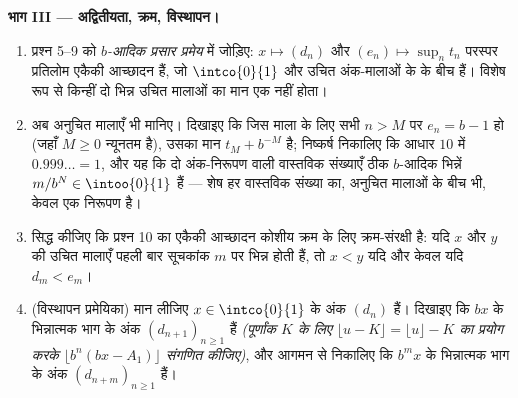 \begin{problem}
\medskip \noindent\textbf{भाग III --- अद्वितीयता, क्रम, विस्थापन।}
\begin{enumerate}[resume]
  \item प्रश्न 5--9 को \emph{$b$-आदिक प्रसार प्रमेय} में जोड़िए: 
  $x \mapsto (d_n)$ और $(e_n) \mapsto \sup_n t_n$ परस्पर प्रतिलोम एकैकी
  आच्छादन हैं, जो $\intco{0}{1}$ और उचित अंक-मालाओं के  के बीच हैं।
  विशेष रूप से किन्हीं दो भिन्न उचित मालाओं का मान एक नहीं होता।
  \item अब अनुचित मालाएँ भी मानिए। दिखाइए कि जिस माला के लिए सभी $n > M$ पर
  $e_n = b - 1$ हो (जहाँ $M \geq 0$ न्यूनतम है), उसका मान $t_M + b^{-M}$ है;
  निष्कर्ष निकालिए कि आधार $10$ में $0.999\dots = 1$, और यह कि दो अंक-निरूपण
  वाली वास्तविक संख्याएँ ठीक $b$-आदिक भिन्नें $m/b^N \in \intoo{0}{1}$ हैं
  --- शेष हर वास्तविक संख्या का, अनुचित मालाओं के बीच भी, केवल एक निरूपण है।
  \item सिद्ध कीजिए कि प्रश्न 10 का एकैकी आच्छादन कोशीय क्रम के लिए
  क्रम-संरक्षी है: यदि $x$ और $y$ की उचित मालाएँ पहली बार सूचकांक $m$ पर
  भिन्न होती हैं, तो $x < y$ यदि और केवल यदि $d_m < e_m$।
  \item (विस्थापन प्रमेयिका) मान लीजिए $x \in \intco{0}{1}$ के अंक $(d_n)$
  हैं। दिखाइए कि $bx$ के भिन्नात्मक भाग के अंक $(d_{n+1})_{n \geq 1}$ हैं
  \emph{(पूर्णांक $K$ के लिए $\lfloor u - K \rfloor = \lfloor u \rfloor - K$
  का प्रयोग करके $\lfloor b^n(bx - A_1)\rfloor$ संगणित कीजिए)}, और आगमन से
  निकालिए कि $b^m x$ के भिन्नात्मक भाग के अंक $(d_{n+m})_{n \geq 1}$ हैं।
\end{enumerate}


\end{problem}
